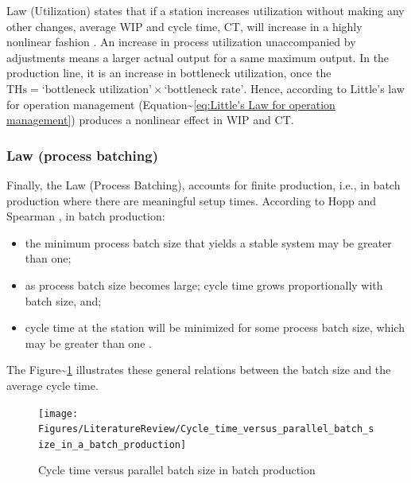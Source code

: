 \documentclass{article}
\begin{document}
Law (Utilization) states that if a station increases utilization without making any other changes, average WIP and cycle time, CT, will increase in a highly nonlinear fashion \citep[p.303]{Hopp2001}.
An increase in process utilization unaccompanied by adjustments means a larger actual output for a same maximum output.
In the production line, it is an increase in bottleneck utilization, once the \(\mbox{THs} = \mbox{`bottleneck utilization'}\times\mbox{`bottleneck rate'}\).
Hence, according to Little's law for operation management (Equation\textasciitilde{}\ref{eq:Little's Law for operation management}) produces a nonlinear effect in WIP and CT.

\subsubsection{Law (process batching)}
\label{sec:org24455bc}

Finally, the Law (Process Batching), accounts for finite production, i.e., in batch production where there are meaningful setup times.
According to Hopp and Spearman \cite{Hopp2001}, in batch production:

\begin{itemize}
    \item the minimum process batch size that yields a stable system may be greater than one;
    \item as process batch size becomes large; cycle time grows proportionally with batch size, and;
    \item cycle time at the station will be minimized for some process batch size, which may be greater than one \citep[p.306]{Hopp2001}.
\end{itemize}

The Figure\textasciitilde{}\ref{fig:Cycle time versus parallel batch size in batch production} illustrates these general relations between the batch size and the average cycle time.

\begin{figure}[H]
  \centering
  \texttt{[image: Figures/LiteratureReview/Cycle\_time\_versus\_parallel\_batch\_size\_in\_a\_batch\_production]}
  \caption{Cycle time versus parallel batch size in batch production}\label{fig:Cycle time versus parallel batch size in batch production}
\end{figure}
\end{document}
